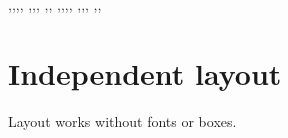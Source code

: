 \documentclass{article}
\edef\savedpageformat{%
  \the\paperwidth,\the\paperheight,\the\textwidth,\the\textheight,%
  \the\oddsidemargin,\the\evensidemargin,\the\topmargin,%
  \the\headheight,\the\headsep,\the\footskip}
\begin{document}
\makeatletter
{}
\makeatother
\edef\currentpageformat{%
  \the\paperwidth,\the\paperheight,\the\textwidth,\the\textheight,%
  \the\oddsidemargin,\the\evensidemargin,\the\topmargin,%
  \the\headheight,\the\headsep,\the\footskip}
\ifx\savedpageformat\currentpageformat\else
\fi
\section{Independent layout}
Layout works without fonts or boxes.
\end{document}
